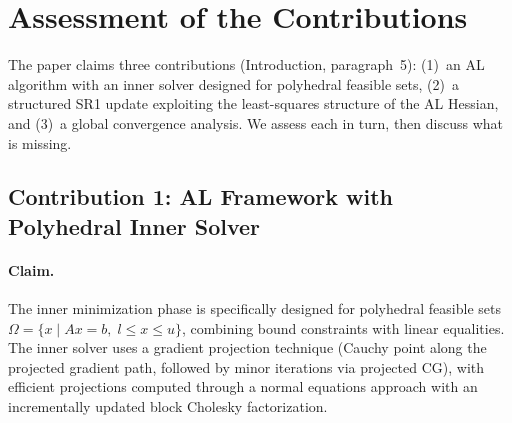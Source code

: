 \documentclass[11pt]{article}
\theoremstyle{plain}
\begin{document}
\section{Assessment of the Contributions}\label{sec:contributions}

The paper claims three contributions (Introduction, paragraph~5): (1)~an AL algorithm with an inner solver designed for polyhedral feasible sets, (2)~a structured SR1 update exploiting the least-squares structure of the AL Hessian, and (3)~a global convergence analysis. We assess each in turn, then discuss what is missing.

\subsection{Contribution 1: AL Framework with Polyhedral Inner Solver}

\paragraph{Claim.} The inner minimization phase is specifically designed for polyhedral feasible sets $\Omega = \{x \mid Ax = b,\; l \le x \le u\}$, combining bound constraints with linear equalities. The inner solver uses a gradient projection technique (Cauchy point along the projected gradient path, followed by minor iterations via projected CG), with efficient projections computed through a normal equations approach with an incrementally updated block Cholesky factorization.
\end{document}

